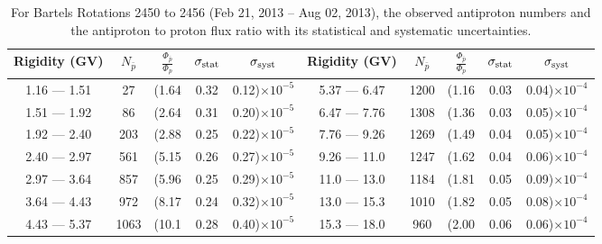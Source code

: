 \begin{table}[p] 
\renewcommand\baselinestretch{1.3}\selectfont
\setlength\tabcolsep{3pt}
\centering
\begin{tabular}{ccccc | ccccc}
\hline
\textbf{Rigidity}  (GV)  & $N_{\bar{p}}$ & $\frac{\Phi_{\bar{p}}}{\Phi_{p}}$ & $\sigma_{\rm{stat}}$ & $\sigma_{\rm{syst}}$ \hspace{1cm}   & \textbf{Rigidity}  (GV)  & $N_{\bar{p}}$ & $\frac{\Phi_{\bar{p}}}{\Phi_{p}}$ & $\sigma_{\rm{stat}}$ & $\sigma_{\rm{syst}}$ \hspace{1cm} \\ 
\hline
1.16 — 1.51   &  27                  &(1.64                          &  0.32              &      0.12)$\times 10^{-5}$  & 5.37 — 6.47                &  1200                   &(1.16                                &  0.03                   &      0.04)$\times 10^{-4}$\\
1.51 — 1.92   &  86                  &(2.64                          &  0.31              &      0.20)$\times 10^{-5}$  & 6.47 — 7.76                &  1308                   &(1.36                                &  0.03                   &      0.05)$\times 10^{-4}$\\
1.92 — 2.40   &  203                &(2.88                          &  0.25              &      0.22)$\times 10^{-5}$  & 7.76 — 9.26                &  1269                    &(1.49                                &  0.04                  &      0.05)$\times 10^{-4}$\\    
2.40 — 2.97   &  561                &(5.15                          &  0.26              &      0.27)$\times 10^{-5}$  & 9.26 — 11.0                &  1247                    &(1.62                                &  0.04                   &      0.06)$\times 10^{-4}$\\    
2.97 — 3.64   &  857                &(5.96                          &  0.25              &      0.29)$\times 10^{-5}$  & 11.0 — 13.0                 &  1184                    &(1.81                                &  0.05                   &      0.09)$\times 10^{-4}$\\
3.64 — 4.43   &  972                &(8.17                          &  0.24              &      0.32)$\times 10^{-5}$  & 13.0 — 15.3               &  1010                    &(1.82                                &  0.05                   &      0.08)$\times 10^{-4}$\\
4.43 — 5.37   &  1063              &(10.1                          &  0.28              &      0.40)$\times 10^{-5}$  & 15.3 — 18.0               &  960                      &(2.00                                &  0.06                   &      0.06)$\times 10^{-4}$\\
\hline
\end{tabular}
\caption[Antiproton to proton flux ratio for Bartels Rotations 2450 to 2456]{For Bartels Rotations 2450 to 2456 (Feb 21, 2013 – Aug 02, 2013), the observed antiproton numbers and the antiproton to proton flux ratio with its statistical and systematic uncertainties.}
\label{TableOfDependent5}
\end{table}

